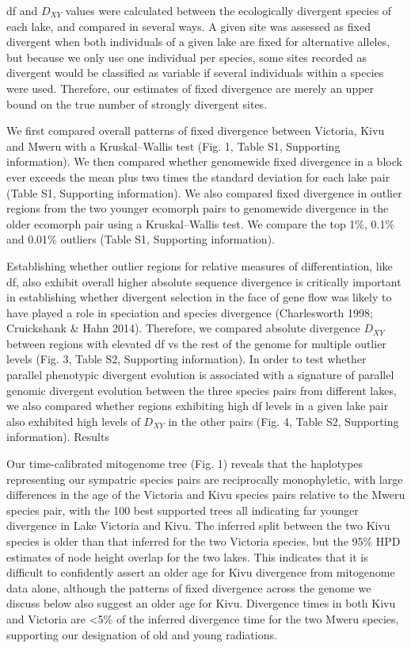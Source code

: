df and $D_{XY}$ values were calculated between the ecologically divergent species of each lake, and compared in several ways. A given site was assessed as fixed divergent when both individuals of a given lake are fixed for alternative alleles, but because we only use one individual per species, some sites recorded as divergent would be classified as variable if several individuals within a species were used. Therefore, our estimates of fixed divergence are merely an upper bound on the true number of strongly divergent sites.

We first compared overall patterns of fixed divergence between Victoria, Kivu and Mweru with a Kruskal–Wallis test (Fig. 1, Table S1, Supporting information). We then compared whether genomewide fixed divergence in a block ever exceeds the mean plus two times the standard deviation for each lake pair (Table S1, Supporting information). We also compared fixed divergence in outlier regions from the two younger ecomorph pairs to genomewide divergence in the older ecomorph pair using a Kruskal–Wallis test. We compare the top 1\%, 0.1\% and 0.01\% outliers (Table S1, Supporting information).

Establishing whether outlier regions for relative measures of differentiation, like df, also exhibit overall higher absolute sequence divergence is critically important in establishing whether divergent selection in the face of gene flow was likely to have played a role in speciation and species divergence (Charlesworth 1998; Cruickshank & Hahn 2014). Therefore, we compared absolute divergence $D_{XY}$ between regions with elevated df vs the rest of the genome for multiple outlier levels (Fig. 3, Table S2, Supporting information). In order to test whether parallel phenotypic divergent evolution is associated with a signature of parallel genomic divergent evolution between the three species pairs from different lakes, we also compared whether regions exhibiting high df levels in a given lake pair also exhibited high levels of $D_{XY}$ in the other pairs (Fig. 4, Table S2, Supporting information).
Results

Our time-calibrated mitogenome tree (Fig. 1) reveals that the haplotypes representing our sympatric species pairs are reciprocally monophyletic, with large differences in the age of the Victoria and Kivu species pairs relative to the Mweru species pair, with the 100 best supported trees all indicating far younger divergence in Lake Victoria and Kivu. The inferred split between the two Kivu species is older than that inferred for the two Victoria species, but the 95\% HPD estimates of node height overlap for the two lakes. This indicates that it is difficult to confidently assert an older age for Kivu divergence from mitogenome data alone, although the patterns of fixed divergence across the genome we discuss below also suggest an older age for Kivu. Divergence times in both Kivu and Victoria are <5\% of the inferred divergence time for the two Mweru species, supporting our designation of old and young radiations.

